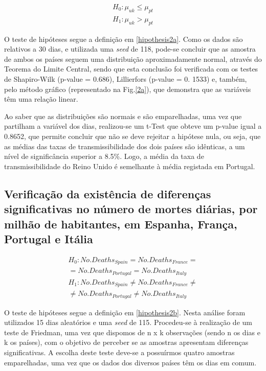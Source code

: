 \documentclass[conference]{IEEEtran}
\begin{document}
\begin{equation}
  \begin{array}{l}
    H_{0}:\mu _{uk}\leq \mu _{pt} \\
   	H_{1}:\mu _{uk}> \mu _{pt}
  \end{array}\label{hipothesis2a}
\end{equation}

O teste de hipóteses segue a definição em \eqref{hipothesis2a}. Como os dados são relativos a 30 dias, e utilizada uma \textit{seed} de 118, pode-se concluir que as amostra de ambos os países seguem uma distribuição aproximadamente normal, através do Teorema do Limite Central, sendo que esta conclusão foi verificada com os testes de Shapiro-Wilk (p-value = 0.686), Lillierfors (p-value = 0. 1533) e, também, pelo método gráfico (representado na Fig.\ref{2a}), que demonstra que as variáveis têm uma relação linear. 

Ao saber que as distribuições são normais e são emparelhadas, uma vez que partilham a variável dos dias, realizou-se um t-Test que obteve um p-value igual a 0.8652, que permite concluir que não se deve rejeitar a hipótese nula, ou seja, que as médias das taxas de transmissibilidade dos dois países são idênticas, a um nível de significância superior a 8.5\%. Logo, a média da taxa de transmissibilidade do Reino Unido é semelhante à média registada em Portugal.


\subsection{Verificação da existência de diferenças significativas no número de mortes diárias, por milhão de habitantes, em Espanha, França, Portugal e Itália}
\begin{equation}
  \begin{array}{l}
    H_{0}:No.Deaths_{Spain}=No.Deaths_{France}= \\
    =No.Deaths_{Portugal}=No.Deaths_{Italy} \\
    H_{1}:No.Deaths_{Spain}\neq No.Deaths_{France}\neq \\
    \neq No.Deaths_{Portugal}\neq No.Deaths_{Italy}
  \end{array}\label{hipothesis2b}
\end{equation}

O teste de hipóteses segue a definição em \eqref{hipothesis2b}. Nesta análise foram utilizados 15 dias aleatórios e uma \textit{seed} de 115. Procedeu-se à realização de um teste de Friedman, uma vez que dispomos de n x k observações (sendo n os dias e k os países), com o objetivo de perceber se as amostras apresentam diferenças significativas. A escolha deste teste deve-se a possuírmos quatro amostras emparelhadas, uma vez que os dados dos diversos países têm os dias em comum.
\end{document}

